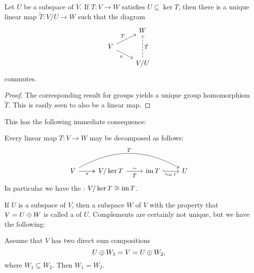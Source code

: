 \begin{theorem}
    Let $U$ be a subspace of $V$. If $T \colon V \to W$ satisfies $U \subseteq \ker T$, then there is a unique linear map $\tilde{T} \colon V/U \to W$ such that the diagram
    \begin{equation*}
        \begin{tikzcd}[row sep=small]
            & W \\
            V
                \ar[ur, "T"]
                \ar[dr, "\pi", swap] \\
            & V/U
                \ar[uu, "\tilde{T}", swap, dashed]
        \end{tikzcd}
    \end{equation*}
    commutes.
\end{theorem}

\begin{proof}
    The corresponding result for groups yields a unique group homomorphism $\tilde{T}$. This is easily seen to also be a linear map. %
\end{proof}
%
This has the following immediate consequence:

\begin{corollarynoproof}
    \label{cor:canonical-decomposition}
    Every linear map $T \colon V \to W$ may be decomposed as follows:
    \begin{equation*}
        \begin{tikzcd}
            V
                \ar[r, "\pi", swap, twoheadrightarrow]
                \ar[rrr, bend left, "T"]
            & V/\ker T
                \ar[r, "\sim", "\tilde{T}"']
            & \im T
                \ar[r, "\iota_{\im T}", swap, hookrightarrow]
            & U
        \end{tikzcd}
    \end{equation*}
    In particular we have the : $V/\ker T \cong \operatorname{im} T$.
\end{corollarynoproof}

If $U$ is a subspace of $V$, then a subspace $W$ of $V$ with the property that $V = U \oplus W$ is called a  of $U$. Complements are certainly not unique, but we have the following:

\begin{lemma}
    \label{lem:nested-complements}
    Assume that $V$ has two direct sum compositions
    \begin{equation*}
        U \oplus W_1
            = V
            = U \oplus W_2,
    \end{equation*}
    where $W_1 \subseteq W_2$. Then $W_1 = W_2$.
\end{lemma}

